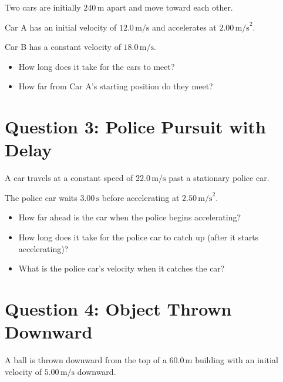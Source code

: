 \documentclass[12pt]{article}
\begin{document}
Two cars are initially $240 \, \text{m}$ apart and move toward each other.

Car A has an initial velocity of $12.0 \, \text{m/s}$ and accelerates at $2.00 \, \text{m/s}^2$.

Car B has a constant velocity of $18.0 \, \text{m/s}$.

\begin{itemize}
\item[(a)] How long does it take for the cars to meet?
\vspace{8cm}

\item[(b)] How far from Car A's starting position do they meet?
\vspace{8cm}

\end{itemize}

\newpage

\section*{Question 3: Police Pursuit with Delay}

A car travels at a constant speed of $22.0 \, \text{m/s}$ past a stationary police car.

The police car waits $3.00 \, \text{s}$ before accelerating at $2.50 \, \text{m/s}^2$.

\begin{itemize}
\item[(a)] How far ahead is the car when the police begins accelerating?
\vspace{7cm}

\item[(b)] How long does it take for the police car to catch up (after it starts accelerating)?
\vspace{9cm}

\item[(c)] What is the police car's velocity when it catches the car?
\vspace{6cm}

\end{itemize}

\newpage

\section*{Question 4: Object Thrown Downward}

A ball is thrown downward from the top of a $60.0 \, \text{m}$ building with an initial velocity of $5.00 \, \text{m/s}$ downward.
\end{document}

